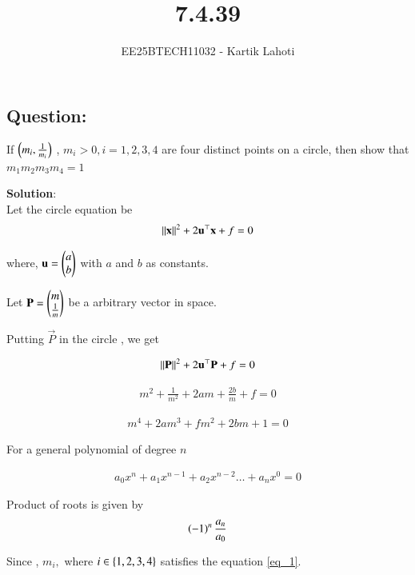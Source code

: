 \documentclass[journal]{IEEEtran}
\numberwithin{equation}{enumi}
\numberwithin{figure}{enumi}
\begin{document}

\vspace{3cm}

\title{7.4.39}
\author{EE25BTECH11032 - Kartik Lahoti}
\maketitle

\subsection*{Question: } 

If $\left(m_i , \frac{1}{m_i}\right)$ , $m_i > 0 , i = 1, 2,3,4$ are four distinct points on a circle, then show that $m_1m_2m_3m_4 = 1 $

\textbf{Solution}:\\


Let the circle equation be 
\begin{align}
    \left\lVert\mathbf{x}\right\rVert^2 + 2\mathbf{u}^{\top}\mathbf{x} + f = 0 
\end{align}

where, $\mathbf{u} = \begin{pmatrix}a \\ b\end{pmatrix}$ with $a$ and $b$ as constants.

Let $\mathbf{P} = \begin{pmatrix}m \\ \frac{1}{m}\end{pmatrix}$ be a arbitrary vector in space.

Putting $\vec{P}$ in the circle , we get 


\begin{align}
    \left\lVert\mathbf{P}\right\rVert^2 + 2\mathbf{u}^{\top}\mathbf{P} + f = 0 
\end{align}

\begin{align}
    m^2 + \frac{1}{m^2} + 2am + \frac{2b}{m} + f = 0
\end{align}

\begin{align}
    m^4 + 2am^3 + fm^2 + 2bm + 1 = 0 \label{eq_1}
\end{align}

For a general polynomial of degree $n$

\begin{align}
    a_0x^n + a_1x^{n-1} + a_2x^{n-2} \dots + a_nx^0 = 0  
\end{align}

Product of roots is given by 
\begin{align}
    \left(-1\right)^n\frac{a_n}{a_0}
\end{align}

Since , $m_i , $ where $ i \in \left\{1,2,3,4\right\} $ satisfies the equation \ref{eq_1}.
\end{document}
